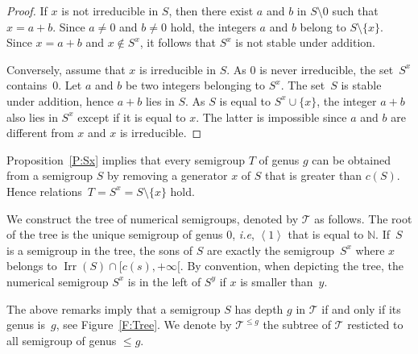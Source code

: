 \documentclass[reqno,11pt]{amsart}
\theoremstyle{plain}
\theoremstyle{definition}
\newcommand{\ie}{\emph{i.e.}}
\renewcommand{\leq}{\leqslant}
\newcommand{\NN}{\mathbb{N}}
\renewcommand{\ie}{\emph{i.e}}
\DeclareMathOperator{\Irr}{Irr}
\begin{document}
\begin{proof}
If $x$ is not irreducible in  $S$, then there exist $a$ and $b$ in $S\setminus{0}$ such that $x=a+b$. 
Since $a\not=0$ and $b\not=0$ hold, the integers  $a$ and $b$ belong to $S\setminus\{x\}$. 
Since $x=a+b$ and $x\not\in S^x$, it follows that  $S^x$ is not stable under addition. 

Conversely, assume that $x$ is irreducible in  $S$. 
As $0$ is never irreducible, the set~$S^x$ contains~$0$. 
Let $a$ and $b$ be two integers belonging to $S^x$. 
The set~$S$ is stable under addition, hence $a+b$ lies in $S$. 
As $S$ is equal to $S^x\cup\{x\}$, the integer $a+b$ also lies in $S^x$ except if it is equal to $x$. 
The latter is impossible since $a$ and $b$ are different from $x$ and $x$ is irreducible.
\end{proof}

Proposition~\ref{P:Sx} implies that every semigroup $T$ of genus $g$ can be obtained from a semigroup $S$ by removing a generator $x$ of $S$ that is greater than $c(S)$.
Hence relations~$T=S^x=S\setminus\{x\}$ hold.

We construct the tree of numerical semigroups, denoted by $\mathcal{T}$ as follows. 
The root of the tree is the unique semigroup of genus $0$, \ie, $\left<1\right>$ that is equal to $\NN$. 
If~$S$ is a semigroup in the tree,  the sons of $S$ are exactly the semigroup~$S^x$ where $x$ belongs to $\Irr(S)\cap[c(s),+\infty[$. 
By convention, when depicting the tree, the numerical semigroup $S^x$ is in the left of $S^y$ if $x$ is smaller than~$y$. 

The above remarks imply that a semigroup $S$ has depth $g$ in $\mathcal{T}$ if and only if its genus is~$g$, see Figure~\ref{F:Tree}.
We denote by $\mathcal{T}^{\leq g}$ the subtree of $\mathcal{T}$ resticted to all semigroup of genus $\leq g$.
\end{document}
